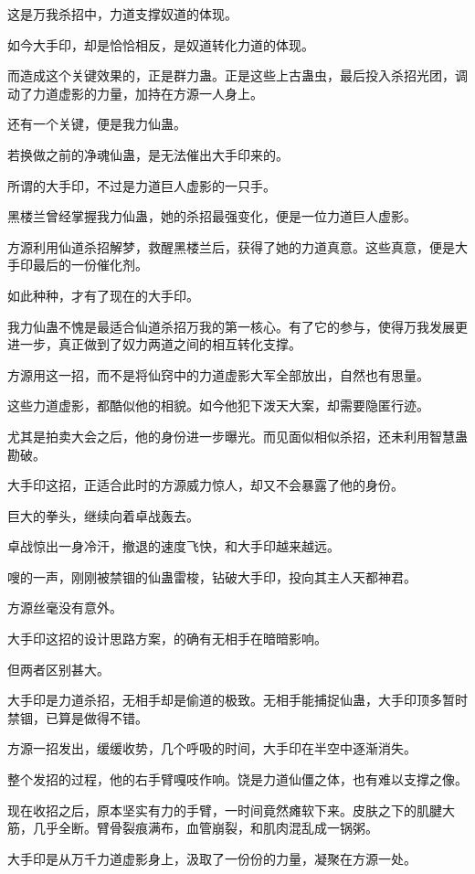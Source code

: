 \begin{this_body}
这是万我杀招中，力道支撑奴道的体现。

如今大手印，却是恰恰相反，是奴道转化力道的体现。

而造成这个关键效果的，正是群力蛊。正是这些上古蛊虫，最后投入杀招光团，调动了力道虚影的力量，加持在方源一人身上。

还有一个关键，便是我力仙蛊。

若换做之前的净魂仙蛊，是无法催出大手印来的。

所谓的大手印，不过是力道巨人虚影的一只手。

黑楼兰曾经掌握我力仙蛊，她的杀招最强变化，便是一位力道巨人虚影。

方源利用仙道杀招解梦，救醒黑楼兰后，获得了她的力道真意。这些真意，便是大手印最后的一份催化剂。

如此种种，才有了现在的大手印。

我力仙蛊不愧是最适合仙道杀招万我的第一核心。有了它的参与，使得万我发展更进一步，真正做到了奴力两道之间的相互转化支撑。

方源用这一招，而不是将仙窍中的力道虚影大军全部放出，自然也有思量。

这些力道虚影，都酷似他的相貌。如今他犯下泼天大案，却需要隐匿行迹。

尤其是拍卖大会之后，他的身份进一步曝光。而见面似相似杀招，还未利用智慧蛊勘破。

大手印这招，正适合此时的方源威力惊人，却又不会暴露了他的身份。

巨大的拳头，继续向着卓战轰去。

卓战惊出一身冷汗，撤退的速度飞快，和大手印越来越远。

嗖的一声，刚刚被禁锢的仙蛊雷梭，钻破大手印，投向其主人天都神君。

方源丝毫没有意外。

大手印这招的设计思路方案，的确有无相手在暗暗影响。

但两者区别甚大。

大手印是力道杀招，无相手却是偷道的极致。无相手能捕捉仙蛊，大手印顶多暂时禁锢，已算是做得不错。

方源一招发出，缓缓收势，几个呼吸的时间，大手印在半空中逐渐消失。

整个发招的过程，他的右手臂嘎吱作响。饶是力道仙僵之体，也有难以支撑之像。

现在收招之后，原本坚实有力的手臂，一时间竟然瘫软下来。皮肤之下的肌腱大筋，几乎全断。臂骨裂痕满布，血管崩裂，和肌肉混乱成一锅粥。

大手印是从万千力道虚影身上，汲取了一份份的力量，凝聚在方源一处。


\end{this_body}
